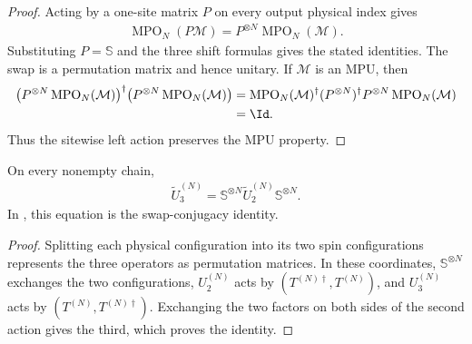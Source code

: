 \begin{proof}\leanok
    Acting by a one-site matrix $P$ on every output physical index gives
    \begin{align}
        \operatorname{MPO}_N(P\mathcal M)
        =P^{\otimes N}\operatorname{MPO}_N(\mathcal M).
    \end{align}
    Substituting $P=\mathbb S$ and the three shift formulas gives the stated
    identities. The swap is a permutation matrix and hence unitary. If
    $\mathcal M$ is an MPU, then
    \begin{align}
        \bigl(P^{\otimes N}\operatorname{MPO}_N(\mathcal M)\bigr)^\dagger
        \bigl(P^{\otimes N}\operatorname{MPO}_N(\mathcal M)\bigr)
         & =\operatorname{MPO}_N(\mathcal M)^\dagger
        (P^{\otimes N})^\dagger P^{\otimes N}
        \operatorname{MPO}_N(\mathcal M)             \\
         & =\Id.
    \end{align}
    Thus the sitewise left action preserves the MPU property.
\end{proof}

\begin{lemma}
    \label{thm:tildeU3}
    \leanok
    On every nonempty chain,
    \begin{align}
        \widetilde U_3^{(N)}
        =\mathbb S^{\otimes N}\widetilde U_2^{(N)}\mathbb S^{\otimes N}.
    \end{align}
    In \cite[lines~2059--2062]{Cirac2017MPU}, this equation is the swap-conjugacy
    identity.
\end{lemma}

\begin{proof}\leanok
    Splitting each physical configuration into its two spin configurations represents the
    three operators as permutation matrices.  In these coordinates,
    $\mathbb S^{\otimes N}$ exchanges the two configurations,
    $U_2^{(N)}$ acts by $(T^{(N)\dagger},T^{(N)})$, and $U_3^{(N)}$ acts by
    $(T^{(N)},T^{(N)\dagger})$.  Exchanging the two factors on both sides of
    the second action gives the third, which proves the identity.
\end{proof}

